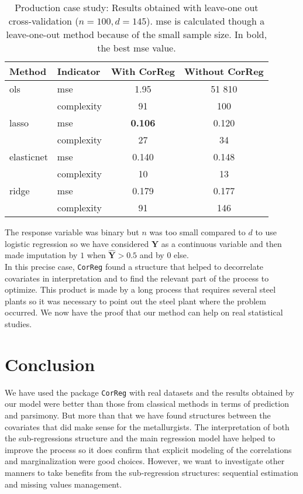 \documentclass[12pt,a4paper]{report}
\begin{document}
\begin{table}[h!]
\centering
\begin{tabular}{llcc}
	\hline 
	Method& Indicator& With {\sc CorReg} & Without {\sc CorReg} \\ 
	\hline\hline
	{\sc ols} &  {\sc mse}& 1.95& 51 810\\
		& complexity & 91& 100 \\
	\hline 
		{\sc lasso} & {\sc mse} & {\bf 0.106} & 0.120\\
		& complexity & 27&34\\
	\hline 
		elasticnet & {\sc mse} &0.140 &0.148\\
		& complexity &10 &13\\
	\hline 
		ridge & {\sc mse} & 0.179 & 0.177\\
		& complexity &91 &146\\
	\hline 
\end{tabular} 
\caption{Production case study: Results obtained with leave-one out cross-validation ($n=100, d=145$). {\sc mse} is calculated though a leave-one-out method because of the small sample size. In bold, the best {\sc mse} value.}	\label{Res_prod}
\end{table}
The response variable was binary but $n$ was too small compared to $d$ to use logistic regression so we have considered $\boldsymbol{Y}$ as a continuous variable and then made imputation by $1$ when $\hat{\boldsymbol{Y}}>0.5$ and by $0$ else.\\

In this precise case, {\tt CorReg} found a structure that helped to decorrelate covariates in interpretation and to find the relevant part of the process to optimize. This product is made by a long process that requires several steel plants so it was necessary to point out the steel plant where the problem occurred. We now have the proof that our method can help on real statistical studies.

\section{Conclusion}
We have used the package {\tt CorReg} with real datasets and the results obtained by our model were better than those from classical methods in terms of prediction and parsimony. But more than that we have found structures between the covariates that did make sense for the metallurgists. The interpretation of both the sub-regressions structure and the main regression model have helped to improve the process so it does confirm that explicit modeling of the correlations and marginalization were good choices. However, we want to investigate other manners to take benefits from the sub-regression structures: sequential estimation and missing values management.
\end{document}
